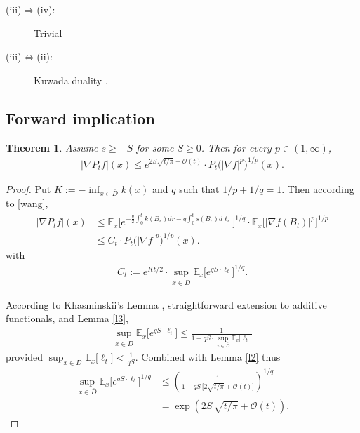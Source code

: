 \documentclass[a4paper,12pt]{article}
\theoremstyle{plain}
\newtheorem{theorem}[thm]{Theorem}
\begin{document}
\begin{description}
\item[(iii)$\Rightarrow$(iv):] Trivial
\item[(iii)$\Leftrightarrow$(ii):] Kuwada duality \cite{Ku10}.
\end{description}

\subsection{Forward implication}

\begin{theorem} Assume $s\ge -S$ for some $S\ge0$. Then for every $p\in (1,\infty)$,
\begin{align}
\big| \nabla P_{t}f\big|(x)\le e^{2S \sqrt{t/\pi}+ \mathcal{O}(t)}\cdot   P_{t}\big(|\nabla f|^p\big)^{1/p}(x).
\end{align}
\end{theorem}

\begin{proof} 
Put $K:=-\inf_{x\in \bar D} k(x)$ and $q$ such that $1/p+1/q=1$. Then according to \eqref{wang},
\begin{align*}
\big| \nabla P_{t}f\big|(x)&\le \mathbb E_{x}\Big[ e^{-\frac{q}2\int_0^{t}  k(B_{r})dr-q\int_0^{t} s(B_r)d\ell_r}
\Big]^{1/q}\cdot \mathbb E_{x}\Big[ \big|\nabla f(B_{t})\big|^p\Big]^{1/p}\\
&\le C_t\cdot   P_{t}\big(|\nabla f|^p\big)^{1/p}(x).
\end{align*}
with 
\begin{align*} C_t:=e^{Kt/2}\cdot \sup_{x\in \bar D}\mathbb E_{x}\Big[ e^{q S \cdot\ell_t}\Big]^{1/q}.
\end{align*}

 According to Khasminskii's Lemma \cite{Kh59}, straightforward extension to additive functionals, and Lemma \ref{l3},
\begin{align} \sup_{x\in \bar D}\mathbb E_{x}\Big[ e^{q S \cdot\ell_t}\Big] \le
\frac1{1-qS \cdot \sup_{x\in \bar D}\mathbb E_{x}\big[\ell_t\big]}
\end{align}
provided $\sup_{x\in \bar D}\mathbb E_{x}\big[\ell_t\big]<\frac1{qS}$.
Combined with Lemma  \ref{l2} thus
\begin{align*} \sup_{x\in \bar D}\mathbb E_{x}\Big[ e^{q S \cdot\ell_t}\Big]^{1/q} &\le \left(
\frac1{1-qS \, \big[2\sqrt{t/\pi}+ {\mathcal O}(t)\big]}\right)^{1/q}\\
&=\exp\left(2S \, \sqrt{t/\pi}+ {\mathcal O}(t)
\right).
\end{align*}
\end{proof}
\end{document}
